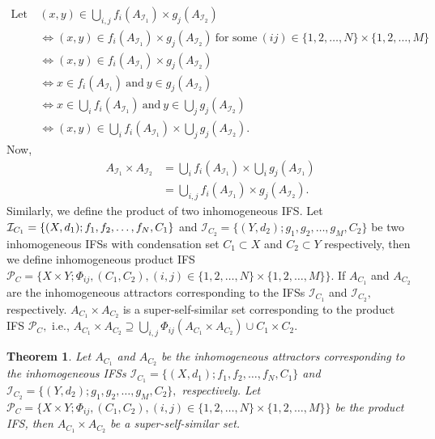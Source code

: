 \documentclass[12pt,oneside,reqno]{amsart}
\newtheorem{theorem}{Theorem}[section]
\theoremstyle{definition}
\theoremstyle{remark}
\begin{document}
  \begin{equation*}
     \begin{aligned}
       \text{Let}~ &(x,y) \in \bigcup_{i,j} f_i(A_{\mathcal{I}_1}) \times g_j(A_{\mathcal{I}_2}) \\& \Longleftrightarrow (x,y) \in f_i(A_{\mathcal{I}_1}) \times g_j(A_{\mathcal{I}_2}) ~ \text{for some}~ (ij) \in \{1,2,\ldots,N\}\times \{1,2,\ldots,M\} \\& \Longleftrightarrow (x,y) \in f_i(A_{\mathcal{I}_1}) \times g_j(A_{\mathcal{I}_2}) \\& \Longleftrightarrow x \in f_i(A_{\mathcal{I}_1}) ~\text{and}~ y \in  g_j(A_{\mathcal{I}_2}) \\& \Longleftrightarrow x \in \bigcup_{i} f_i(A_{\mathcal{I}_1}) ~ \text{and} ~ y \in \bigcup_{j} g_j(A_{\mathcal{I}_2}) \\& \Longleftrightarrow (x,y) \in \bigcup_{i} f_i(A_{\mathcal{I}_1}) \times \bigcup_{j} g_j(A_{\mathcal{I}_2}).
     \end{aligned}
 \end{equation*}
Now,
 \begin{equation*}
     \begin{aligned}
   A_{\mathcal{I}_1} \times A_{\mathcal{I}_2} &= \bigcup_{i} f_i(A_{\mathcal{I}_1}) \times \bigcup_{i} g_j(A_{\mathcal{I}_1}) \\&= \bigcup_{i,j} f_i(A_{\mathcal{I}_1}) \times g_j(A_{\mathcal{I}_2}).
     \end{aligned}
 \end{equation*}
 Similarly, we define the product of two inhomogeneous IFS. Let $\mathcal{I}_{C_1}=   \{(X,d_1); f_1,f_2,\ldots,\\f_N,C_1\}$ and $\mathcal{I}_{C_2}= \{(Y,d_2); g_1,g_2,\ldots,g_M, C_2\}$ be two inhomogeneous IFSs with condensation set $C_1 \subset X$ and $C_2 \subset Y$ respectively, then we define inhomogeneous product IFS $\mathcal{P}_C= \{X\times Y; \Phi_{ij},(C_1,C_2),(i,j) \in \{1,2,\ldots,N\}\times \{1,2,\ldots,M\}\}.$ If $A_{C_1}$ and $A_{C_2}$ are the inhomogeneous attractors corresponding to the IFSs $\mathcal{I}_{C_1}$ and $\mathcal{I}_{C_2},$ respectively.  $A_{C_1} \times A_{C_2}$ is a super-self-similar set corresponding to the product IFS $\mathcal{P}_C,$ i.e., $A_{C_1} \times A_{C_2} \supseteq \bigcup_{i,j} \Phi_{ij}(A_{C_1}\times A_{C_2}) \cup C_1 \times C_2.$
\begin{theorem}
    Let $A_{C_1}$ and $A_{C_2}$ be the inhomogeneous attractors corresponding to the inhomogeneous IFSs $\mathcal{I}_{C_1}=    \{(X,d_1); f_1,f_2,\ldots,f_N,C_1\}$ and $\mathcal{I}_{C_2}= \{(Y,d_2); g_1,g_2,\ldots,g_M, C_2\},$ respectively. Let $\mathcal{P}_C= \{X\times Y; \Phi_{ij},(C_1,C_2),(i,j) \in \{1,2,\ldots,N\}\times \{1,2,\ldots,M\}\}$ be the product IFS, then $A_{C_1} \times A_{C_2}$ be a super-self-similar set.
\end{theorem}
\end{document}

